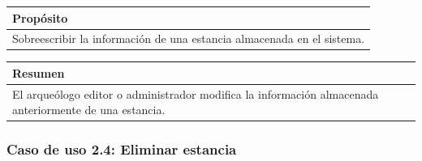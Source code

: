     \begin{table}[H]
        \centering
        \begin{tabularx}{\textwidth}{@{} |L |@{}} \hline
            \textbf{Propósito} \\
            \hline
            Sobreescribir la información de una estancia almacenada en el sistema. \\
            \hline
        \end{tabularx}
    \end{table}

    \begin{table}[H]
        \centering
        \begin{tabularx}{\textwidth}{@{} |L |@{}} \hline
            \textbf{Resumen} \\
            \hline
            El arqueólogo editor o administrador modifica la información almacenada
            anteriormente de una estancia.\\
            \hline
        \end{tabularx}
    \end{table}

\subsubsection{Caso de uso 2.4: Eliminar estancia}


